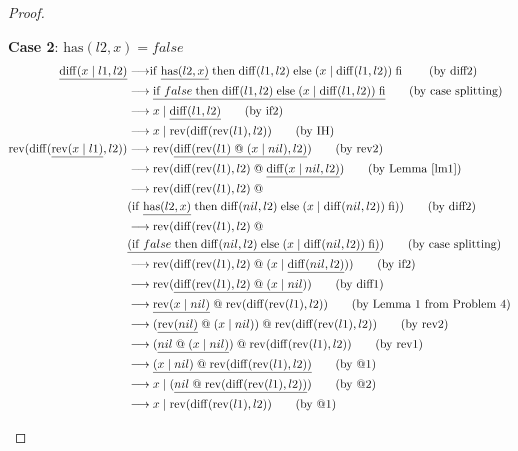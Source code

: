 \documentclass[12pt, a4paper]{article}
\newcommand{\rel}[1]{\mathrel{#1}}
\newcommand{\rmx}[1]{\mathrm{#1}}
\newcommand{\larrow}{\longrightarrow}
\newcommand{\under}{\underline}
\begin{document}
\begin{proof}
\begin{description}
\textbf{Case 2}: $\rmx{has}(l2, x) = false$
\begin{align*}
\under{\rmx{diff}(x \rel{|} l1, l2)}
	&\larrow \rel{\rmx{if}} \under{\rmx{has}(l2, x)} \rel{\rmx{then}} \rmx{diff}(l1, l2) \rel{\rmx{else}} (x \rel{|} \rmx{diff}(l1, l2)) \rel{\rmx{fi}} \tag{by diff2} \\
	&\larrow \under{\rel{\rmx{if}} false \rel{\rmx{then}} \rmx{diff}(l1, l2) \rel{\rmx{else}} (x \rel{|} \rmx{diff}(l1, l2)) \rel{\rmx{fi}}} \tag{by case splitting} \\
	&\larrow x \rel{|} \under{\rmx{diff}(l1, l2)} \tag{by if2} \\
	&\larrow x \rel{|} \rmx{rev}(\rmx{diff}(\rmx{rev}(l1), l2)) \tag{by IH} \\
\rmx{rev}(\rmx{diff}(\under{\rmx{rev}(x \rel{|} l1)}, l2)) 
	&\larrow \rmx{rev}(\under{\rmx{diff}(\rmx{rev}(l1) \rel{@} (x \rel{|} nil), l2)}) \tag{by rev2} \\
	&\larrow  \rmx{rev}(\rmx{diff}(\rmx{rev}(l1), l2) \rel{@} \under{\rmx{diff}(x \rel{|} nil, l2)}) \tag{by Lemma~\ref{lm1}} \\
	&\larrow \rmx{rev}(\rmx{diff}(\rmx{rev}(l1), l2) \rel{@} \\
	&(\rel{\rmx{if}} \under{\rmx{has}(l2, x)} \rel{\rmx{then}} \rmx{diff}(nil, l2) \rel{\rmx{else}} (x \rel{|} \rmx{diff}(nil, l2)) \rel{\rmx{fi}})) \tag{by diff2} \\
	&\larrow \rmx{rev}(\rmx{diff}(\rmx{rev}(l1), l2) \rel{@} \\
	&\under{\rel{(\rmx{if}} false \rel{\rmx{then}} \rmx{diff}(nil, l2) \rel{\rmx{else}} (x \rel{|} \rmx{diff}(nil, l2)) \rel{\rmx{fi}})}) \tag{by case splitting} \\
	&\larrow \rmx{rev}(\rmx{diff}(\rmx{rev}(l1), l2) \rel{@} (x \rel{|} \under{\rmx{diff}(nil, l2)})) \tag{by if2} \\
	&\larrow \rmx{rev}(\under{\rmx{diff}(\rmx{rev}(l1), l2) \rel{@} (x \rel{|} nil})) \tag{by diff1} \\
	&\larrow \under{\rmx{rev}(x \rel{|} nil)} \rel{@} \rmx{rev}(\rmx{diff}(\rmx{rev}(l1), l2))  \tag{by Lemma 1 from Problem 4} \\
	&\larrow (\under{\rmx{rev}(nil)} \rel{@} (x \rel{|} nil)) \rel{@} \rmx{rev}(\rmx{diff}(\rmx{rev}(l1), l2))  \tag{by rev2} \\
	&\larrow (\under{nil \rel{@} (x \rel{|} nil)}) \rel{@} \rmx{rev}(\rmx{diff}(\rmx{rev}(l1), l2))  \tag{by rev1} \\
	&\larrow \under{(x \rel{|} nil) \rel{@} \rmx{rev}(\rmx{diff}(\rmx{rev}(l1), l2))}  \tag{by @1} \\
	&\larrow x \rel{|} (\under{nil \rel{@} \rmx{rev}(\rmx{diff}(\rmx{rev}(l1), l2))})  \tag{by @2} \\
	&\larrow x \rel{|} \rmx{rev}(\rmx{diff}(\rmx{rev}(l1), l2)) \tag{by @1}
\end{align*}

\end{description}

\end{proof}
\end{document}
